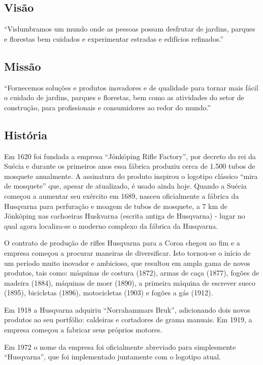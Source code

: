 \documentclass[12pt]{article}
\begin{document}
\subsection{Visão}
	``Vislumbramos um mundo onde as pessoas possam desfrutar de jardins, parques e florestas bem cuidados e experimentar estradas e edifícios refinados.''

\subsection{Missão}
	``Fornecemos soluções e produtos inovadores e de qualidade para tornar mais fácil o cuidado de jardins, parques e florestas, bem como as atividades do setor de construção, para profissionais e consumidores ao redor do mundo.''

	
\subsection{História}
	Em 1620 foi fundada a empresa “Jönköping Rifle Factory”, por decreto do rei da Suécia e durante os primeiros anos essa fábrica produziu cerca de 1.500 tubos de mosquete anualmente. A assinatura do produto inspirou o logotipo clássico “mira de mosquete” que, apesar de atualizado, é usado ainda hoje.
	Quando a Suécia começou a aumentar seu exército em 1689, nasceu oficialmente a fábrica da Husqvarna para perfuração e moagem de tubos de mosquete, a 7 km de Jönköping nas cachoeiras Huskvarna (escrita antiga de Husqvarna) - lugar no qual agora localiza-se o moderno complexo da fábrica da Husqvarna.

	O contrato de produção de rifles Husqvarna para a Coroa chegou ao fim e a empresa começou a procurar maneiras de diversificar. Isto tornou-se o início de um período muito inovador e ambicioso, que resultou em ampla gama de novos produtos, tais como: máquinas de costura (1872), armas de caça (1877), fogões de madeira (1884), máquinas de moer (1890), a primeira máquina de escrever sueco (1895), bicicletas (1896), motocicletas (1903) e fogões a gás (1912).

	Em 1918 a Husqvarna adquiriu “Norrahammars Bruk”, adicionando dois novos produtos ao seu portfólio: caldeiras e cortadores de grama manuais. Em 1919, a empresa começou a fabricar seus próprios motores.

	Em 1972 o nome da empresa foi oficialmente abreviado para simplesmente “Husqvarna”, que foi implementado juntamente com o logotipo atual.
\end{document}
